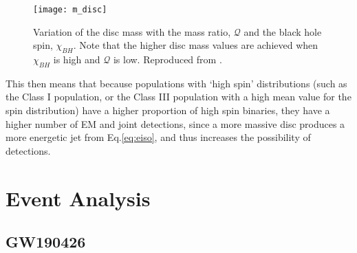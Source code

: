     \begin{figure}[H]
        \centering
        \texttt{[image: m\_disc]}
        \caption[Variation of $M_{\mathrm{disc}}$ with $\chi_{BH}$ and $\mathcal{Q}$]{
            Variation of the disc mass with the mass ratio, $\mathcal{Q}$ and the black
            hole spin, $\chi_{BH}$. Note that the higher disc mass values are achieved
            when $\chi_{BH}$ is high and $\mathcal{Q}$ is low. Reproduced from
            \cite{barbieri_2019}.
        }
        \label{fig:m_disc}
    \end{figure}

    This then means that because populations with `high spin' distributions (such as the
    Class I population, or the Class III population with a high mean value for the spin
    distribution) have a higher proportion of high spin binaries, they have a higher
    number of EM and joint detections, since a more massive disc produces a more
    energetic jet from Eq.\ref{eq:eiso}, and thus increases the possibility of
    detections.

\section{Event Analysis}\label{sec:event_analysis}

    \subsection{GW190426}

